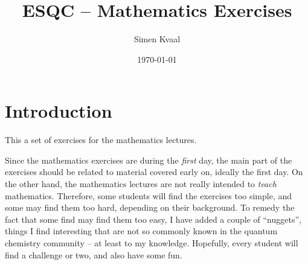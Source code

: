 \documentclass[12pt]{report}
\title{ESQC -- Mathematics Exercises}
\author{Simen Kvaal}
\date{\today}
\newcommand{\exercisesmytitle}{\ifthenelse{\isundefined\showsolutions}{A}{B}}
\begin{document}



\newpage
\tableofcontents

\chapter*{Introduction}

This a set of exercises for the mathematics lectures. 

Since the mathematics exercises are during the \emph{first} day, the main part of the exercises should be related to material covered early on, ideally the first day. On the other hand, the mathematics lectures are not really intended to \emph{teach} mathematics. Therefore, some students will find the exercises too simple, and some may find them too hard, depending on their background. To remedy the fact that some find may find them too easy, I have added a couple of ``nuggets'', things I find interesting that are not so commonly known in the quantum chemistry community -- at least to my knowledge. Hopefully, every student will find a challenge or two, and also have some fun.
\end{document}
